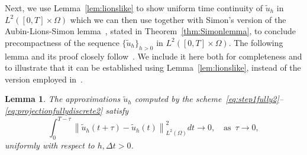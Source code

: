 \documentclass[10pt,letterpaper]{amsart}
\newcommand{\tu}{\widetilde{u}}
\newcommand\norm[1]{\left\lVert#1\right\rVert}
\newcommand{\dom}{\Omega}
\newtheorem{lemma}{Lemma}[section]
\theoremstyle{definition}{\newtheorem{definition}[lemma]{Definition}}
\numberwithin{equation}{section}
\begin{document}
Next, we use Lemma~\ref{lem:lionslike} to show uniform time continuity of $\tu_h$ in $L^2([0,T]\times\dom)$ which we can then use together with Simon's version of the Aubin-Lions-Simon lemma~\cite[Theorem 1]{Simon1987}, stated in Theorem~\ref{thm:Simonlemma}, to conclude precompactness of the sequence $\{\tu_h\}_{h>0}$ in $L^2([0,T]\times\dom)$. The following lemma and its proof closely follow~\cite[Lemma 3.6]{Eymard2024}. We include it here both for completeness and to illustrate that it can be established using Lemma~\ref{lem:lionslike}, instead of the version employed in~\cite{Eymard2024}.
\begin{lemma}\label{lem:timecont}
	The approximations $\tu_h$ computed by the scheme~\eqref{eq:step1fully2}--\eqref{eq:projectionfullydiscrete2} satisfy
	\begin{equation}
		\label{eq:timecont2}
		\int_0^{T-\tau}\norm{\tu_h(t+\tau)-\tu_h(t)}_{L^2(\dom)}^2 dt \longrightarrow 0,\quad \text{as }\, \tau\to 0,
	\end{equation}
	uniformly with respect to $h,\Delta t>0$.
\end{lemma}
\end{document}
